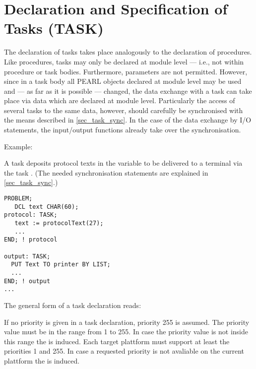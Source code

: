 \section{Declaration and Specification of Tasks (TASK)}   %
\label{sec_task_dcl}

The declaration of tasks takes place analogously to the declaration of
procedures.
Like procedures, tasks may only be declared at
module level --- i.e., not within procedure or task bodies. Furthermore,
parameters are not permitted. However, since in a task body all PEARL
objects declared at module level may be used and --- as far as it is
possible --- changed, the data exchange with a task can take place via
data which are declared at module level. Particularly the access of
several tasks to the same data, however, should carefully be
synchronised with the means described in \ref{sec_task_sync}. In the case of the data 
exchange by I/O statements, the input/output functions
already take over the synchronisation.

Example:

A task  deposits protocol texts in the variable 
 to be
delivered to a terminal via the task .
 (The needed synchronisation
statements are explained in \ref{sec_task_sync}.)

\begin{lstlisting}
PROBLEM;
   DCL text CHAR(60);
protocol: TASK; 
   text := protocolText(27);
   ...
END; ! protocol 

output: TASK;
  PUT Text TO printer BY LIST;
  ...
END; ! output
...
\end{lstlisting}

The general form of a task declaration reads:

\begin{grammarframe}
\end{grammarframe}

If no priority is given in a task declaration, priority 255 is assumed.
The priority value must be in the range from 1 to 255. 
In case the priority value is not inside this range the 
 is induced.
Each target plattform must support at least the priorities 1 and 255.
In case a requested priority is not avaliable on the current 
\OpenPEARL{} plattform
the  is induced.


